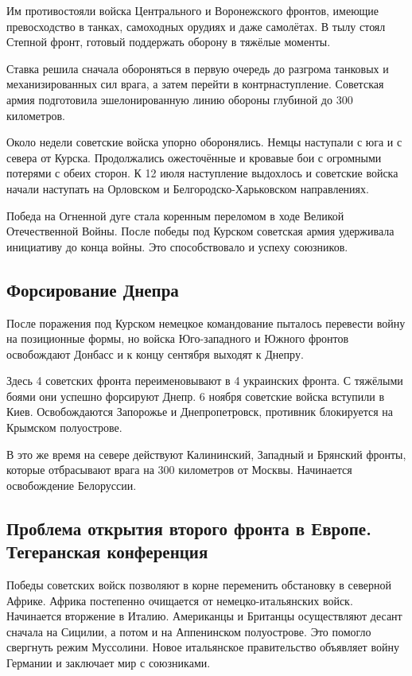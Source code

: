 Им противостояли войска Центрального и Воронежского фронтов, имеющие превосходство в танках, самоходных орудиях и даже самолётах. В тылу стоял Степной фронт, готовый поддержать оборону в тяжёлые моменты.

Ставка решила сначала обороняться в первую очередь до разгрома танковых и механизированных сил врага, а затем перейти в контрнаступление. Советская армия подготовила эшелонированную линию обороны глубиной до 300 километров.

Около недели советские войска упорно оборонялись. Немцы наступали с юга и с севера от Курска. Продолжались ожесточённые и кровавые бои с огромными потерями с обеих сторон. К 12 июля наступление выдохлось и советские войска начали наступать на Орловском и Белгородско-Харьковском направлениях.

Победа на Огненной дуге стала коренным переломом в ходе Великой Отечественной Войны. После победы под Курском советская армия удерживала инициативу до конца войны. Это способствовало и успеху союзников.

\subsection{Форсирование Днепра}

После поражения под Курском немецкое командование пыталось перевести войну на позиционные формы, но  войска Юго-западного и Южного фронтов освобождают Донбасс и к концу сентября выходят к Днепру.

Здесь 4 советских фронта переименовывают в 4 украинских фронта. С тяжёлыми боями они успешно форсируют Днепр. 6 ноября советские войска вступили в Киев. Освобождаются Запорожье и Днепропетровск, противник блокируется на Крымском полуострове.

В это же время на севере действуют Калининский, Западный и Брянский фронты, которые отбрасывают врага на  300 километров от Москвы. Начинается освобождение Белоруссии.

\subsection{Проблема открытия второго фронта в Европе. Тегеранская конференция}

Победы советских войск позволяют в корне переменить обстановку в северной Африке. Африка постепенно очищается от немецко-итальянских войск. Начинается вторжение в Италию. Американцы и Британцы осуществляют десант сначала на Сицилии, а потом и на Аппенинском полуострове. Это помогло свергнуть режим Муссолини. Новое итальянское правительство объявляет войну Германии и заключает мир с союзниками.

